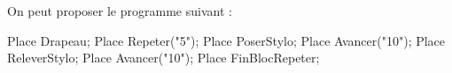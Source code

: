    On peut proposer le programme suivant : \\ [1mm]
   \begin{Scratch}[Echelle=0.7]
      Place Drapeau;
      Place Repeter("5");
         Place PoserStylo;
         Place Avancer("10");
         Place ReleverStylo;
         Place Avancer("10");
      Place FinBlocRepeter;
   \end{Scratch}
